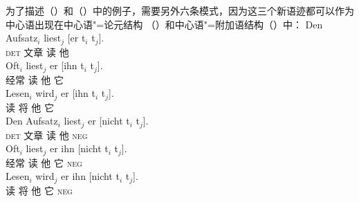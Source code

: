 为了描述（）和（）中的例子，需要另外六条模式，因为这三个新语迹都可以作为中心语出现在中心语"=论元结构 （）和中心语"=附加语结构（）中：
\eal
\ex 
\gll Den Aufsatz$_i$ liest$_j$ [er t$_i$ t$_j$].\\
	\textsc{det} 文章 读 \spacebr{}他\\
\ex 
\gll Oft$_i$ liest$_j$ er [ihn t$_i$ t$_j$].\\
	 经常 读 他 \spacebr{}它\\
\ex 
\gll Lesen$_i$ wird$_j$ er [ihn t$_i$ t$_j$].\\
	读 将 他 \spacebr{}它\\
\zl
\eal
\ex 
\gll Den Aufsatz$_i$ liest$_j$ er [nicht t$_i$ t$_j$].\\
	\textsc{det} 文章 读 他 \spacebr{}\textsc{neg}\\
\ex 
\gll Oft$_i$ liest$_j$ er ihn [nicht t$_i$ t$_j$].\\
	 经常 读 他 它 \spacebr{}\textsc{neg}\\
\ex 
\gll Lesen$_i$ wird$_j$ er ihn [nicht t$_i$ t$_j$].\\
	 读 将 他 它 \spacebr{}\textsc{neg}\\
